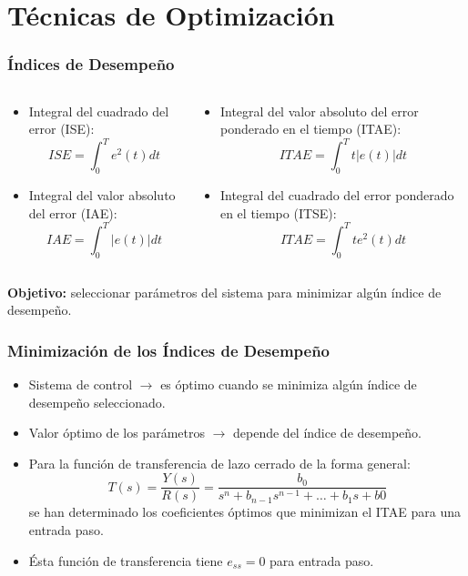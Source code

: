 \documentclass[aspectratio=169]{beamer}
\theoremstyle{definition}
\theoremstyle{plain}
\theoremstyle{remark}
\begin{document}
\section{Técnicas de Optimización}
\begin{frame}[<+->]\frametitle{Índices de Desempeño}
	\begin{columns}
	\begin{column}{0.5\textwidth}
	\begin{itemize}
		\item Integral del cuadrado del error (ISE):
		\begin{equation*}
			ISE = \int_0^T e^2(t) dt
		\end{equation*}
		\item Integral del valor absoluto del error (IAE):
		\begin{equation*}
			IAE = \int_0^T |e(t)| dt
		\end{equation*}
	\end{itemize}
	\end{column}	
	\begin{column}{0.5\textwidth}
	\begin{itemize}
		\item Integral del valor absoluto del error ponderado en el tiempo (ITAE):
		\begin{equation*}
			ITAE = \int_0^T t |e(t)| dt
		\end{equation*}
		\item Integral del cuadrado del error ponderado en el tiempo (ITSE):
		\begin{equation*}
			ITAE = \int_0^T t e^2(t) dt
		\end{equation*}
	\end{itemize}
	\end{column}	
	\end{columns}
	\vspace*{-5mm}
	\textbf{Objetivo:} seleccionar parámetros del sistema para minimizar algún índice de desempeño.
\end{frame}
\begin{frame}[<+->]\frametitle{Minimización de los Índices de Desempeño}
\begin{itemize}
	\item Sistema de control $\rightarrow$ es óptimo cuando se minimiza algún índice de desempeño seleccionado.
	\item Valor óptimo de los parámetros $\rightarrow$ depende del índice de desempeño.
	\item Para la función de transferencia de lazo cerrado de la forma general:
	\begin{equation*}
		T(s) = \frac{Y(s)}{R(s)} = \frac{b_0}{s^n + b_{n-1} s^{n-1} + \dots + b_1 s + b0}
	\end{equation*}
	se han determinado los coeficientes óptimos que minimizan el ITAE para una entrada paso.
	\item Ésta función de transferencia tiene $e_{ss} = 0$ para entrada paso.
\end{itemize}
\end{frame}
\end{document}
